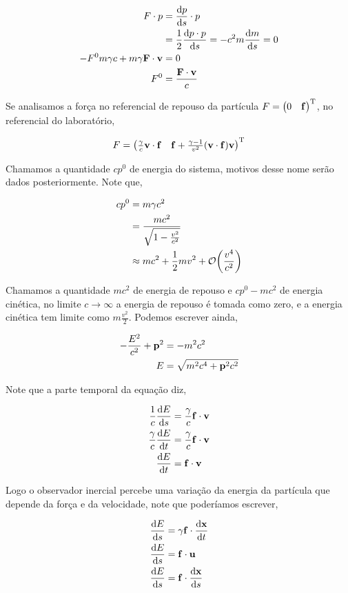 \documentclass[twoside]{amsart}
\numberwithin{equation}{section}
\begin{document}
\begin{align}
    F\cdot p&=\dv{p}{s}\cdot p\\
    &=\frac12\dv{p\cdot p}{s}=-c^2m\dv{m}{s}=0\\
    -F^0m\gamma c+m\gamma \vb F\cdot \vb v&=0\\
    F^0&=\frac{\vb F\cdot \vb v}{c}
\end{align}

Se analisamos a força no referencial de repouso da partícula $F=\mqty(0&\vb f)^{\textup T}$, no referencial do laboratório,

\begin{align}
    F=\mqty(\frac\gamma c\vb v\cdot \vb f&\vb f+\frac{\gamma - 1}{v^2}\qty(\vb v\cdot \vb f)\vb v)^{\textup T}
\end{align}

Chamamos a quantidade $cp^0$ de energia do sistema, motivos desse nome serão dados posteriormente. Note que,

\begin{align}
    cp^0&=m\gamma c^2\\
    &=\frac{mc^2}{\sqrt{1-\frac{v^2}{c^2}}}\\
    &\approx mc^2+\frac12 mv^2+\mathcal O\qty(\frac{v^4}{c^2})
\end{align}

Chamamos a quantidade $mc^2$ de energia de repouso e $cp^0-mc^2$ de energia cinética, no limite $c\rightarrow \infty$ a energia de repouso é tomada como zero, e a energia cinética tem limite como $m\frac{v^2}{2}$. Podemos escrever ainda,

\begin{align}
    -\frac{E^2}{c^2}+{\vb p}^2&=-m^2c^2\\
    E&=\sqrt{m^2c^4+{\vb p}^2c^2}
\end{align}

Note que a parte temporal da equação diz,

\begin{align}
    \frac1c\dv{E}{s}&=\frac\gamma c\vb f\cdot \vb v\\
    \frac\gamma c\dv{E}{t}&=\frac\gamma c\vb f\cdot \vb v\\
    \dv{E}{t}&=\vb f\cdot \vb v
\end{align}

Logo o observador inercial percebe uma variação da energia da partícula que depende da força e da velocidade, note que poderíamos escrever,

\begin{align}
    \dv{E}{s}&=\gamma\vb f \cdot \dv{\vb x}{t}\\
    \dv{E}{s}&=\vb f\cdot \vb u\\
    \dv{E}{s}&=\vb f\cdot \dv{\vb x}{s}
\end{align}
\end{document}
